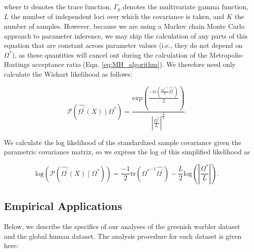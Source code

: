 \documentclass[12pt]{article}
\newcommand{\identifyadmixsource}[1]{{#1^{*}}}
\begin{document}
where $\text{tr}$ denotes the trace function, $\Gamma_{p}$ denotes the multivariate gamma function, $L$ the number of independent loci over which the covariance is taken, and $K$ the number of samples.  However, because we are using a Markov chain Monte Carlo approach to parameter inference, we may skip the calculation of any parts of this equation that are constant across parameter values (i.e., they do not depend on $\identifyadmixsource{\Omega}$), as these quantities will cancel out during the calculation of the Metropolis-Hastings acceptance ratio (Eqn. \eqref{eq:MH_algorithm}).  We therefore need only calculate the Wishart likelihood as follows:

\begin{equation}
\mathcal{P}(\widehat{\Omega^{\prime}}(X) \; | \; \identifyadmixsource{\Omega}) = \frac{ \text{exp} \left(  \frac{-\text{tr}(\frac{\identifyadmixsource{\Omega}^{-1}}{L}\widehat{\Omega^{\prime}})}{2}	\right) }	
									{  |\frac{\identifyadmixsource{\Omega}}{L}|^{\frac{L}{2}}  }.
\label{eq:simple_wishart}
\end{equation}

We calculate the log likelihood of the standardized sample covariance given the parametric covariance matrix, so we express the log of this simplified likelihood as 

\begin{equation}
\text{log}\left(	\mathcal{P}(\widehat{\Omega^{\prime}}(X) \; |
			 \; \identifyadmixsource{\Omega}) \right) = 
			\frac{-1}{2} \text{tr}(\identifyadmixsource{\Omega}^{-1}\widehat{\Omega^{\prime}}) - 
									\frac{L}{2} \text{log}\left(  \left|\frac{\identifyadmixsource{\Omega}}{L}\right| \right)\text{.}
\label{eq:log_simple_wishart}
\end{equation}


\subsection*{Empirical Applications}
Below, we describe the specifics of our analyses of the greenish warbler dataset and the global human dataset.  The analysis procedure for each dataset is given here:
\end{document}
